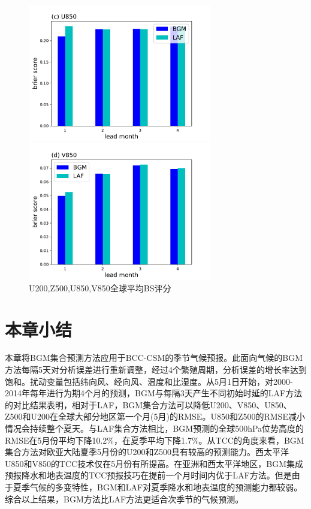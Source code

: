 \begin{figure}[H]
\centering
\begin{minipage}[t]{0.48\textwidth}
\centering
\includegraphics[width=8cm]{figures/brier-15-U850.pdf}
\end{minipage}
\begin{minipage}[t]{0.48\textwidth}
\centering
\includegraphics[width=8cm]{figures/brier-15-V850.pdf}
\end{minipage}
\caption{U200,Z500,U850,V850全球平均BS评分}
\label{fig:BS}
\end{figure}

\section{本章小结}

本章将BGM集合预测方法应用于BCC-CSM的季节气候预报。此面向气候的BGM方法每隔5天对分析误差进行重新调整，经过4个繁殖周期，分析误差的增长率达到饱和。扰动变量包括纬向风、经向风、温度和比湿度。从5月1日开始，对2000-2014年每年进行为期4个月的预测，BGM与每隔3天产生不同初始时延的LAF方法的对比结果表明，相对于LAF，BGM集合方法可以降低U200、V850、U850、Z500和U200在全球大部分地区第一个月(5月)的RMSE。U850和Z500的RMSE减小情况会持续整个夏天。与LAF集合方法相比，BGM预测的全球500hPa位势高度的RMSE在5月份平均下降10.2\%，在夏季平均下降1.7\%。从TCC的角度来看，BGM集合方法对欧亚大陆夏季5月份的U200和Z500具有较高的预测能力。西太平洋U850和V850的TCC技术仅在5月份有所提高。在亚洲和西太平洋地区，BGM集成预报降水和地表温度的TCC预报技巧在提前一个月时间内优于LAF方法。但是由于夏季气候的多变特性，BGM和LAF对夏季降水和地表温度的预测能力都较弱。综合以上结果，BGM方法比LAF方法更适合次季节的气候预测。

